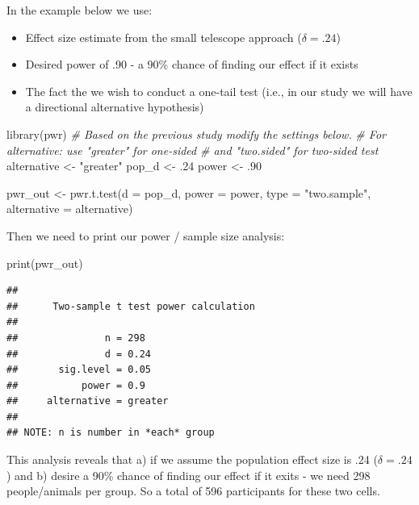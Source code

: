 \documentclass[
]{krantz}
\makeatletter
\newenvironment{Shaded}{\begin{snugshade}}{\end{snugshade}}
\newcommand{\AttributeTok}[1]{\textcolor[rgb]{0.61,0.61,0.61}{#1}}
\newcommand{\CommentTok}[1]{\textcolor[rgb]{0.37,0.37,0.37}{\textit{#1}}}
\newcommand{\DecValTok}[1]{\textcolor[rgb]{0.06,0.06,0.06}{#1}}
\newcommand{\FunctionTok}[1]{\textcolor[rgb]{0,0,0}{#1}}
\newcommand{\NormalTok}[1]{#1}
\newcommand{\OtherTok}[1]{\textcolor[rgb]{0.37,0.37,0.37}{#1}}
\newcommand{\StringTok}[1]{\textcolor[rgb]{0.5,0.5,0.5}{#1}}
\newenvironment{kframe}{%
\medskip{}
\setlength{\fboxsep}{.8em}
 \def\at@end@of@kframe{}%
 \ifinner\ifhmode%
  \def\at@end@of@kframe{\end{minipage}}%
  \begin{minipage}{\columnwidth}%
 \fi\fi%
 \def\FrameCommand##1{\hskip\@totalleftmargin \hskip-\fboxsep
 \colorbox{shadecolor}{##1}\hskip-\fboxsep
     \hskip-\linewidth \hskip-\@totalleftmargin \hskip\columnwidth}%
 \MakeFramed {\advance\hsize-\width
   \@totalleftmargin\z@ \linewidth\hsize
   \@setminipage}}%
 {\par\unskip\endMakeFramed%
 \at@end@of@kframe}
\renewenvironment{Shaded}{\begin{kframe}}{\end{kframe}}
\makeatother
\begin{document}
In the example below we use:

\begin{itemize}
\item
  Effect size estimate from the small telescope approach (\(\delta = .24\))
\item
  Desired power of .90 - a 90\% chance of finding our effect if it exists
\item
  The fact the we wish to conduct a one-tail test (i.e., in our study we will have a directional alternative hypothesis)
\end{itemize}

\begin{Shaded}
\begin{Highlighting}[]
\FunctionTok{library}\NormalTok{(pwr)}
\CommentTok{\# Based on the previous study modify the settings below.}
\CommentTok{\# For alternative: use "greater" for one{-}sided }
\CommentTok{\# and "two.sided" for two{-}sided test}
\NormalTok{alternative }\OtherTok{\textless{}{-}} \StringTok{"greater"}
\NormalTok{pop\_d }\OtherTok{\textless{}{-}}\NormalTok{ .}\DecValTok{24}
\NormalTok{power }\OtherTok{\textless{}{-}}\NormalTok{ .}\DecValTok{90}

\NormalTok{pwr\_out }\OtherTok{\textless{}{-}} \FunctionTok{pwr.t.test}\NormalTok{(}\AttributeTok{d =}\NormalTok{ pop\_d, }
                      \AttributeTok{power =}\NormalTok{ power,}
                      \AttributeTok{type =} \StringTok{"two.sample"}\NormalTok{,}
                      \AttributeTok{alternative =}\NormalTok{ alternative)}
\end{Highlighting}
\end{Shaded}

Then we need to print our power / sample size analysis:

\begin{Shaded}
\begin{Highlighting}[]
\FunctionTok{print}\NormalTok{(pwr\_out)}
\end{Highlighting}
\end{Shaded}

\begin{verbatim}
## 
##      Two-sample t test power calculation 
## 
##               n = 298
##               d = 0.24
##       sig.level = 0.05
##           power = 0.9
##     alternative = greater
## 
## NOTE: n is number in *each* group
\end{verbatim}

This analysis reveals that a) if we assume the population effect size is .24 (\(\delta = .24\)) and b) desire a 90\% chance of finding our effect if it exits - we need 298 people/animals per group. So a total of 596 participants for these two cells.
\end{document}
